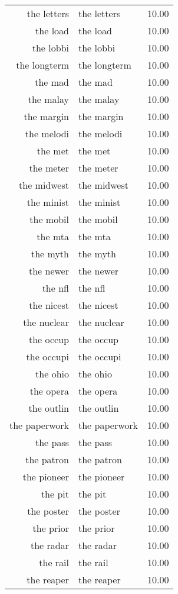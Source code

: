 \begin{table}[ht]
\begin{tabular}{rlr}
  the letters & the letters & 10.00 \\ 
  the load & the load & 10.00 \\ 
  the lobbi & the lobbi & 10.00 \\ 
  the longterm & the longterm & 10.00 \\ 
  the mad & the mad & 10.00 \\ 
  the malay & the malay & 10.00 \\ 
  the margin & the margin & 10.00 \\ 
  the melodi & the melodi & 10.00 \\ 
  the met & the met & 10.00 \\ 
  the meter & the meter & 10.00 \\ 
  the midwest & the midwest & 10.00 \\ 
  the minist & the minist & 10.00 \\ 
  the mobil & the mobil & 10.00 \\ 
  the mta & the mta & 10.00 \\ 
  the myth & the myth & 10.00 \\ 
  the newer & the newer & 10.00 \\ 
  the nfl & the nfl & 10.00 \\ 
  the nicest & the nicest & 10.00 \\ 
  the nuclear & the nuclear & 10.00 \\ 
  the occup & the occup & 10.00 \\ 
  the occupi & the occupi & 10.00 \\ 
  the ohio & the ohio & 10.00 \\ 
  the opera & the opera & 10.00 \\ 
  the outlin & the outlin & 10.00 \\ 
  the paperwork & the paperwork & 10.00 \\ 
  the pass & the pass & 10.00 \\ 
  the patron & the patron & 10.00 \\ 
  the pioneer & the pioneer & 10.00 \\ 
  the pit & the pit & 10.00 \\ 
  the poster & the poster & 10.00 \\ 
  the prior & the prior & 10.00 \\ 
  the radar & the radar & 10.00 \\ 
  the rail & the rail & 10.00 \\ 
  the reaper & the reaper & 10.00 \\ 

\end{tabular}
\end{table}
